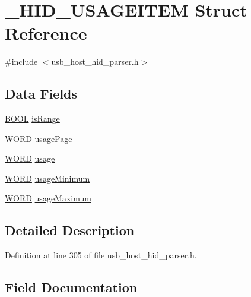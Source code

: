 \hypertarget{struct___h_i_d___u_s_a_g_e_i_t_e_m}{}\section{\+\_\+\+H\+I\+D\+\_\+\+U\+S\+A\+G\+E\+I\+T\+E\+M Struct Reference}
\label{struct___h_i_d___u_s_a_g_e_i_t_e_m}


{\ttfamily \#include $<$usb\+\_\+host\+\_\+hid\+\_\+parser.\+h$>$}

\subsection*{Data Fields}
\begin{DoxyCompactItemize}
\item 
\hyperlink{_generic_type_defs_8h_a54d65c7fa62e62c9754371e42f5111b9}{B\+O\+O\+L} \hyperlink{struct___h_i_d___u_s_a_g_e_i_t_e_m_adeb138fd85166f4e28653db71f8223f2}{is\+Range}
\item 
\hyperlink{_generic_type_defs_8h_a2b0e863dadf920709ec53d9088ee7c91}{W\+O\+R\+D} \hyperlink{struct___h_i_d___u_s_a_g_e_i_t_e_m_aa44ef18c8cbb507831398f1e85c62d0b}{usage\+Page}
\item 
\hyperlink{_generic_type_defs_8h_a2b0e863dadf920709ec53d9088ee7c91}{W\+O\+R\+D} \hyperlink{struct___h_i_d___u_s_a_g_e_i_t_e_m_a2de656b5ffc625e0e129e11bac77b325}{usage}
\item 
\hyperlink{_generic_type_defs_8h_a2b0e863dadf920709ec53d9088ee7c91}{W\+O\+R\+D} \hyperlink{struct___h_i_d___u_s_a_g_e_i_t_e_m_a6fb5cde3543cfe1d694b5a6413d51513}{usage\+Minimum}
\item 
\hyperlink{_generic_type_defs_8h_a2b0e863dadf920709ec53d9088ee7c91}{W\+O\+R\+D} \hyperlink{struct___h_i_d___u_s_a_g_e_i_t_e_m_a86c48b81eff65a22a00da2cd9b756805}{usage\+Maximum}
\end{DoxyCompactItemize}


\subsection{Detailed Description}


Definition at line 305 of file usb\+\_\+host\+\_\+hid\+\_\+parser.\+h.



\subsection{Field Documentation}
\hypertarget{struct___h_i_d___u_s_a_g_e_i_t_e_m_adeb138fd85166f4e28653db71f8223f2}{}
